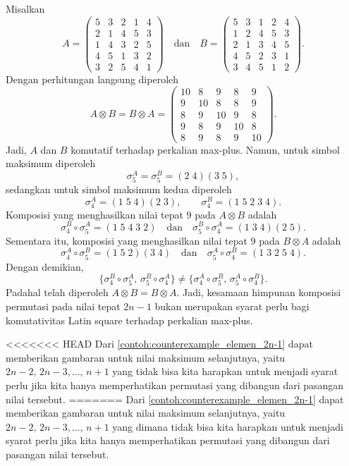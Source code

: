 \begin{contoh}\label{contoh:counterexample_elemen_2n-1}
  Misalkan
  \[
    A=
    \begin{pmatrix}
      5 & 3 & 2 & 1 & 4 \\
      2 & 1 & 4 & 5 & 3 \\
      1 & 4 & 3 & 2 & 5 \\
      4 & 5 & 1 & 3 & 2 \\
      3 & 2 & 5 & 4 & 1
    \end{pmatrix}
    \quad\text{dan}\quad
    B=
    \begin{pmatrix}
      5 & 3 & 1 & 2 & 4 \\
      1 & 2 & 4 & 5 & 3 \\
      2 & 1 & 3 & 4 & 5 \\
      4 & 5 & 2 & 3 & 1 \\
      3 & 4 & 5 & 1 & 2
    \end{pmatrix}.
  \]
  Dengan perhitungan langsung diperoleh
  \[
    A\otimes B
    =
    B\otimes A
    =
    \begin{pmatrix}
      10 & 8  & 9  & 8  & 9  \\
      9  & 10 & 8  & 8  & 9  \\
      8  & 9  & 10 & 9  & 8  \\
      9  & 8  & 9  & 10 & 8  \\
      8  & 9  & 8  & 9  & 10
    \end{pmatrix}.
  \]
  Jadi, $A$ dan $B$ komutatif terhadap perkalian max-plus. Namun, untuk simbol maksimum diperoleh
  \[
    \sigma_5^A=\sigma_5^B=(2\;4)(3\;5),
  \]
  sedangkan untuk simbol maksimum kedua diperoleh
  \[
    \sigma_4^A=(1\;5\;4)(2\;3),
    \qquad
    \sigma_4^B=(1\;5\;2\;3\;4).
  \]
  Komposisi yang menghasilkan nilai tepat $9$ pada $A\otimes B$ adalah
  \[
    \sigma_4^B\circ\sigma_5^A=(1\;5\;4\;3\;2)
    \quad\text{dan}\quad
    \sigma_5^B\circ\sigma_4^A=(1\;3\;4)(2\;5).
  \]
  Sementara itu, komposisi yang menghasilkan nilai tepat $9$ pada $B\otimes A$
  adalah
  \[
    \sigma_4^A\circ\sigma_5^B=(1\;5\;2)(3\;4)
    \quad\text{dan}\quad
    \sigma_5^A\circ\sigma_4^B=(1\;3\;2\;5\;4).
  \]
  Dengan demikian,
  \[
    \{
    \sigma_4^B\circ\sigma_5^A,\,
    \sigma_5^B\circ\sigma_4^A
    \}
    \neq
    \{
    \sigma_4^A\circ\sigma_5^B,\,
    \sigma_5^A\circ\sigma_4^B
    \}.
  \]
  Padahal telah diperoleh $A\otimes B=B\otimes A$. Jadi, kesamaan himpunan
  komposisi permutasi pada nilai tepat $2n-1$ bukan merupakan syarat perlu
  bagi komutativitas Latin square terhadap perkalian max-plus.
\end{contoh}
<<<<<<< HEAD
Dari \autoref{contoh:counterexample_elemen_2n-1} dapat memberikan gambaran untuk nilai maksimum selanjutnya, yaitu $2n-2,\,2n-3,\ldots,\,n+1$ yang tidak bisa kita harapkan untuk menjadi syarat perlu jika kita hanya memperhatikan permutasi yang dibangun dari pasangan nilai tersebut.
=======
Dari \autoref{contoh:counterexample_elemen_2n-1} dapat memberikan gambaran untuk nilai maksimum selanjutnya, yaitu $2n-2,\,2n-3,\ldots,\,n+1$ yang dimana tidak bisa kita harapkan untuk menjadi syarat perlu jika kita hanya memperhatikan permutasi yang dibangun dari pasangan nilai tersebut.

